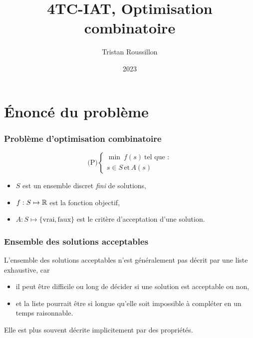 \documentclass{beamer}
\title[]
 {4TC-IAT, Optimisation combinatoire}
\author[T. Roussillon]
 {Tristan Roussillon}
\date{2023}
\institute{INSA Lyon, TC}
\newcommand{\R}{{\ensuremath\mathbb{R}}}
\begin{document}
\begin{frame}
  \titlepage
\end{frame}

\section{\'Enoncé du problème}

\begin{frame}
  \frametitle{Problème d'optimisation combinatoire}

  \[
  \text{(P)} \left\{
  \begin{array}{c}
    \min \ f(s) \ \text{tel que :} \\
    s \in S \, \text{et} \, A(s)
  \end{array}
  \right.
  \]

  \begin{itemize}
  \item $S$ est un ensemble discret \emph{fini} de solutions,
  \item $f : S \mapsto \R$ est la fonction objectif,
  \item $A : S \mapsto \{\text{vrai},\text{faux}\}$ est le critère d'acceptation d'une solution. 
  \end{itemize}
\end{frame}

\begin{frame}
  \frametitle{Ensemble des solutions acceptables}

  L'ensemble des solutions acceptables n'est généralement pas décrit par une liste exhaustive, car

  \begin{itemize}
  \item il peut être difficile ou long de décider si une solution est acceptable ou non,
  \item et la liste pourrait être si longue qu'elle soit impossible à compléter en un temps raisonnable. 
  \end{itemize}
  
  Elle est plus souvent décrite implicitement par des propriétés.  

\end{frame}
\end{document}
